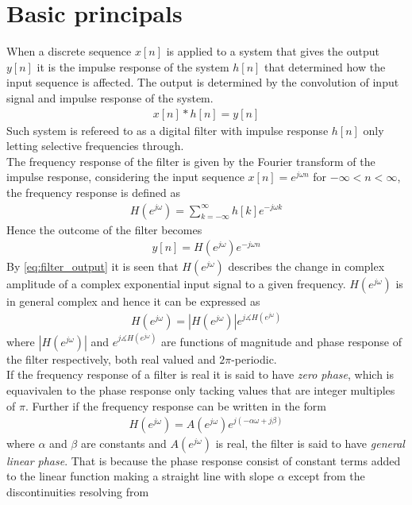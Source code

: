 \section{Basic principals}
When a discrete sequence $x[n]$ is applied to a system that gives the output $y[n]$ it is the impulse response of the system $h[n]$ that determined how the input sequence is affected. The output is determined by the convolution of input signal and impulse response of the system. 
\begin{align}
x[n]*h[n]=y[n]
\end{align}  
Such system is refereed to as a digital filter with impulse response $h[n]$ only letting selective frequencies through.\\ The frequency response of the filter is given by the Fourier transform of the impulse response, considering the input sequence $x[n]=e^{j\omega n}$ for $-\infty < n <\infty$, the frequency response is defined as
\begin{align}
H(e^{j\omega})=\sum_{k=-\infty}^{\infty}h[k]e^{-j\omega k}
\end{align}
Hence the outcome of the filter becomes 
\begin{align}
y[n]=H(e^{j\omega})e^{-j\omega n} \label{eq:filter_output}
\end{align} 
By \eqref{eq:filter_output} it is seen that $H(e^{j\omega})$ describes the change in complex amplitude of a complex exponential input signal to a given frequency. $H(e^{j\omega})$ is in general complex and hence it can be expressed as
\begin{align}
H(e^{j\omega})=|H(e^{j\omega})|e^{j\measuredangle H(e^{j\omega})}
\end{align}  
where $|H(e^{j\omega})|$ and $e^{j\measuredangle H(e^{j\omega})}$ are functions of magnitude and phase response of the filter respectively, both real valued and $2\pi$-periodic.\\ If the frequency response of a filter is real it is said to have \textit{zero phase}, which is equavivalen to the phase response only tacking values that are integer multiples of $\pi$. Further if the frequency response can be written in the form 
\begin{align}
H(e^{j\omega})=A(e^{j\omega})e^{j(-\alpha\omega + j\beta)} 
\end{align}
where $\alpha$ and $\beta$ are constants and $A(e^{j\omega})$ is real,
the filter is said to have \textit{general linear phase}. That is because the phase response consist of constant terms added to the linear function making a straight line with slope $\alpha$ except from the discontinuities resolving from \\
\\

